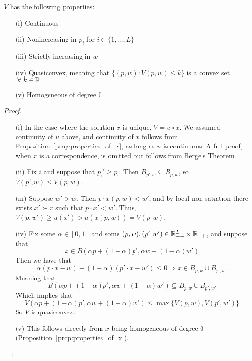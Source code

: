 \documentclass[12pt]{article}
\begin{document}
\begin{proposition}
	$V$ has the following properties:
	\begin{itemize}
		\item[(i)] Continuous
		\item[(ii)] Nonincreasing in $p_i$ for $i \in \{1,\dots,L\}$
		\item[(iii)] Strictly increasing in $w$
		\item[(iv)] Quasiconvex, meaning that $\{(p,w) : V(p,w) \le k\}$ is a convex set $\forall k \in \reals$
		\item[(v)] Homogeneous of degree 0
	\end{itemize}
\end{proposition}
\begin{proof}
	
	\begin{itemize}
		\item[(i)] In the case where the solution $x$ is unique, $V = u \circ x$. We assumed continuity of $u$ above, and continuity of $x$ follows from Proposition~\ref{prop:properties_of_x}, as long as $u$ is continuous. A full proof, when $x$ is a correspondence, is omitted but follows from Berge's Theorem.
		\item[(ii)] Fix $i$ and suppose that $p_i' \ge p_i$. Then $B_{p',w} \subseteq B_{p,w}$, so $V(p',w) \le V(p,w)$.
		\item[(iii)] Suppose $w' > w$. Then $p \cdot x(p,w) < w'$, and by local non-satiation there exists $x' \succ x$ such that $p \cdot x' < w'$. Thus, $V(p,w') \ge u(x') > u(x(p,w)) = V(p,w)$.
		\item[(iv)] Fix some $\alpha \in [0,1]$ and some $(p,w),(p',w') \in \mathbb{R}^L_{++} \times \mathbb{R}_{++}$, and suppose that
		\[
		x \in B(\alpha p + (1-\alpha)p',\alpha w + (1-\alpha)w')
		\]
		Then we have that
		\[
		\alpha (p \cdot x - w) + (1-\alpha) (p' \cdot x - w') \le 0 \Longrightarrow x \in B_{p,w} \cup B_{p',w'}
		\]
		Meaning that
		\[
		B(\alpha p + (1-\alpha)p',\alpha w + (1-\alpha)w') \subseteq  B_{p,w} \cup B_{p',w'}
		\]
		Which implies that
		\[
		V(\alpha p + (1-\alpha)p',\alpha w + (1-\alpha)w') \le \max\{V(p,w),V(p',w')\}
		\]
		So $V$ is quasiconvex.
		\item[(v)] This follows directly from $x$ being homogeneous of degree 0 (Proposition~\ref{prop:properties_of_x}).
	\end{itemize}
\end{proof}
\end{document}

